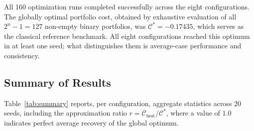 \documentclass[runningheads]{llncs}
\begin{document}
All 160 optimization runs completed successfully across the eight configurations. The globally optimal portfolio cost, obtained by exhaustive evaluation of all $2^n -1 = 127$ non-empty binary portfolios, was $\mathcal{C}^* = -0.17435$, which serves as the classical reference benchmark. All eight configurations reached this optimum in at least one seed; what distinguishes them is average-case performance and consistency.

\subsection{Summary of Results}

Table~\ref{tab:summary} reports, per configuration, aggregate statistics across 20 seeds, including the approximation ratio $r = \overline{\mathcal{C}}_{\text{best}} /\mathcal{C}^*$, where a value of $1.0$ indicates perfect average recovery of the global optimum.
\begin{table}[t]
\caption{Per configuration summary statistics across 20 seeds. $r$ denotes the approximation ratio relative to the classical optimum $\mathcal{C}^* = -0.17435$.}
\label{tab:summary}
\centering
{}
\end{table}
\end{document}
